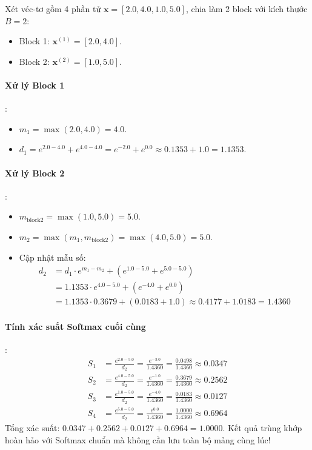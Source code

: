 \begin{example}
Xét véc-tơ gồm 4 phần tử $\mathbf{x} = [2.0, 4.0, 1.0, 5.0]$, chia làm 2 block với kích thước $B = 2$:
\begin{itemize}
  \item Block 1: $\mathbf{x}^{(1)} = [2.0, 4.0]$.
  \item Block 2: $\mathbf{x}^{(2)} = [1.0, 5.0]$.
\end{itemize}
\paragraph{Xử lý Block 1}:
\begin{itemize}
  \item $m_1 = \max(2.0, 4.0) = 4.0$.
  \item $d_1 = e^{2.0 - 4.0} + e^{4.0 - 4.0} = e^{-2.0} + e^{0.0} \approx 0.1353 + 1.0 = 1.1353$.
\end{itemize}
\paragraph{Xử lý Block 2}:
\begin{itemize}
  \item $m_{\text{block2}} = \max(1.0, 5.0) = 5.0$.
  \item $m_2 = \max(m_1, m_{\text{block2}}) = \max(4.0, 5.0) = 5.0$.
  \item Cập nhật mẫu số:
  \begin{align*}
  d_2 &= d_1 \cdot e^{m_1 - m_2} + \left( e^{1.0 - 5.0} + e^{5.0 - 5.0} \right) \\
  &= 1.1353 \cdot e^{4.0 - 5.0} + \left( e^{-4.0} + e^{0.0} \right) \\
  &= 1.1353 \cdot 0.3679 + (0.0183 + 1.0) \approx 0.4177 + 1.0183 = 1.4360
  \end{align*}
\end{itemize}
\paragraph{Tính xác suất Softmax cuối cùng}:
\begin{align*}
S_1 &= \frac{e^{2.0 - 5.0}}{d_2} = \frac{e^{-3.0}}{1.4360} = \frac{0.0498}{1.4360} \approx \mathbf{0.0347} \\
S_2 &= \frac{e^{4.0 - 5.0}}{d_2} = \frac{e^{-1.0}}{1.4360} = \frac{0.3679}{1.4360} \approx \mathbf{0.2562} \\
S_3 &= \frac{e^{1.0 - 5.0}}{d_2} = \frac{e^{-4.0}}{1.4360} = \frac{0.0183}{1.4360} \approx \mathbf{0.0127} \\
S_4 &= \frac{e^{5.0 - 5.0}}{d_2} = \frac{e^{0.0}}{1.4360} = \frac{1.0000}{1.4360} \approx \mathbf{0.6964}
\end{align*}
Tổng xác suất: $0.0347 + 0.2562 + 0.0127 + 0.6964 = 1.0000$. Kết quả trùng khớp hoàn hảo với Softmax chuẩn mà không cần lưu toàn bộ mảng cùng lúc!
\end{example}

